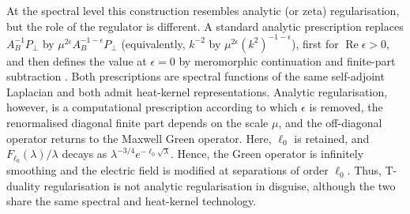 \documentclass[openacc]{rsproca_new}%
\newcommand{\revadd}[1]{#1}
\begin{document}
\revadd{At the spectral level this construction resembles analytic (or zeta) regularisation, but the role of the regulator is different. A standard analytic prescription replaces $A_B^{-1}P_\perp$ by $\mu^{2\epsilon}A_B^{-1-\epsilon}P_\perp$ (equivalently, $k^{-2}$ by $\mu^{2\epsilon}(k^2)^{-1-\epsilon}$), first for $\operatorname{Re}\epsilon>0$, and then defines the value at $\epsilon=0$ by meromorphic continuation and finite-part subtraction \cite{Seeley1967}. Both prescriptions are spectral functions of the same self-adjoint Laplacian and both admit heat-kernel representations. Analytic regularisation, however, is a computational prescription according to which $\epsilon$ is removed, the renormalised diagonal finite part depends on the scale $\mu$, and the off-diagonal operator returns to the Maxwell Green operator. Here, $\ell_0$ is retained, and $F_{\ell_0}(\lambda)/\lambda$ decays as $\lambda^{-3/4}e^{-\ell_0\sqrt{\lambda}}$. Hence, the Green operator is infinitely smoothing and the electric field is modified at separations of order $\ell_0$. Thus, T-duality regularisation is not analytic regularisation in disguise, although the two share the same spectral and heat-kernel technology.}
\end{document}
